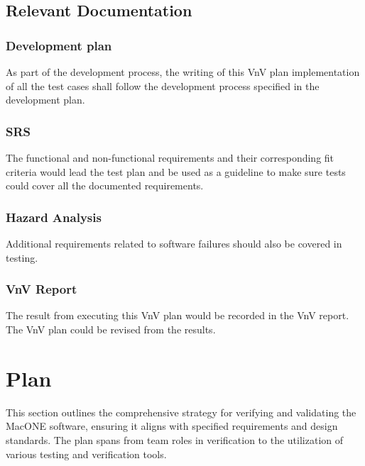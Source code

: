 \documentclass[12pt, titlepage]{article}
\begin{document}
\subsection{Relevant Documentation}
\subsubsection{Development plan}
As part of the development process, the writing of this VnV plan implementation of all the test cases shall follow the development process specified in the development plan.

\subsubsection{SRS}
The functional and non-functional requirements and their corresponding fit criteria would lead the test plan and be used as a guideline to make sure tests could cover all the documented requirements.
\subsubsection{Hazard Analysis}
Additional requirements related to software failures should also be covered in testing.
\subsubsection{VnV Report}
The result from executing this VnV plan would be recorded in the VnV report.  The VnV plan could be revised from the results.
\section{Plan}

This section outlines the comprehensive strategy for verifying and validating the MacONE software, ensuring it aligns with specified requirements and design standards. The plan spans from team roles in verification to the utilization of various testing and verification tools.
\end{document}

